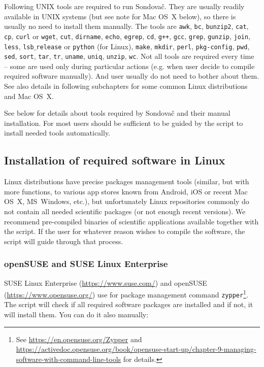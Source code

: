 \documentclass[a4paper, 11pt, twoside]{article}
\begin{document}
Following UNIX tools are required to run Sondovač. They are usually readily available in UNIX systems (but see note for Mac OS~X below), so there is usually no need to install them manually. The tools are \texttt{awk}, \texttt{bc}, \texttt{bunzip2}, \texttt{cat}, \texttt{cp}, \texttt{curl} or \texttt{wget}, \texttt{cut}, \texttt{dirname}, \texttt{echo}, \texttt{egrep}, \texttt{cd}, \texttt{g++}, \texttt{gcc}, \texttt{grep}, \texttt{gunzip}, \texttt{join}, \texttt{less}, \texttt{lsb$\_$release} or \texttt{python} (for Linux), \texttt{make}, \texttt{mkdir}, \texttt{perl}, \texttt{pkg-config}, \texttt{pwd}, \texttt{sed}, \texttt{sort}, \texttt{tar}, \texttt{tr}, \texttt{uname}, \texttt{uniq}, \texttt{unzip}, \texttt{wc}. Not all tools are required every time -- some are used only during particular actions (e.g. when user decide to compile required software manually). And user usually do not need to bother about them. See also details in following subchapters for some common Linux distributions and Mac OS~X.

See below for details about tools required by Sondovač and their manual installation. For most users should be sufficient to be guided by the script to install needed tools automatically.

\subsection{Installation of required software in Linux}
\label{required-linux}

Linux distributions have precise packages management tools (similar, but with more functions, to various app stores known from Android, iOS or recent Mac OS~X, MS~Windows, etc.), but unfortunately Linux repositories commonly do not contain all needed scientific packages (or not enough recent versions). We recommend pre-compiled binaries of scientific applications available together with the script. If the user for whatever reason wishes to compile the software, the script will guide through that process.

\subsubsection{openSUSE and SUSE Linux Enterprise}

SUSE Linux Enterprise (\href{https://www.suse.com/}{https://www.suse.com/}) and openSUSE (\href{https://www.opensuse.org/}{https://www.opensuse.org/}) use for package management command \texttt{zypper}\footnote{See \href{https://en.opensuse.org/Zypper}{https://en.opensuse.org/Zypper} and \href{https://activedoc.opensuse.org/book/opensuse-start-up/chapter-9-managing-software-with-command-line-tools}{https://activedoc.opensuse.org/book/opensuse-start-up/chapter-9-managing-software-with-command-line-tools} for details.}. The script will check if all required software packages are installed and if not, it will install them. You can do it also manually:
\end{document}
